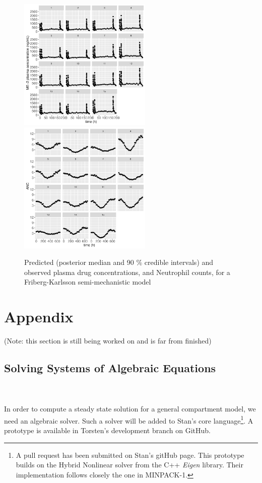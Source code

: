 \documentclass[11pt]{amsart}
\begin{document}
\begin{figure}[htbp]
\includegraphics[width=2.5in,trim=0in 0in 0 0in]{graphics/neutropenia_0.82/neutropeniaPopulationPlots010.pdf}
\includegraphics[width=2.5in,trim=0in 0in 0 0in]{graphics/neutropenia_0.82/neutropeniaPopulationPlots011.pdf}
\caption{{Predicted (posterior median and 90 \% credible intervals) and observed plasma drug concentrations, and Neutrophil counts, for a Friberg-Karlsson semi-mechanistic model}}
\label{FKPredictions}
\end{figure}
 
\clearpage

\section{Appendix}

(Note: this section is still being worked on and is far from finished)

\subsection{Solving Systems of Algebraic Equations} \ \\ \ \\
In order to compute a steady state solution for a general compartment model, we need an algebraic solver. Such a solver will be added to Stan's core language\footnote{A pull request has been submitted on Stan's gitHub page. This prototype builds on the Hybrid Nonlinear solver from the C++ \textit{Eigen} library\cite{eigen}. Their implementation follows closely the one in MINPACK-1\cite{MINPACK}.}. A prototype is available in Torsten's development branch on GitHub.
\end{document}
